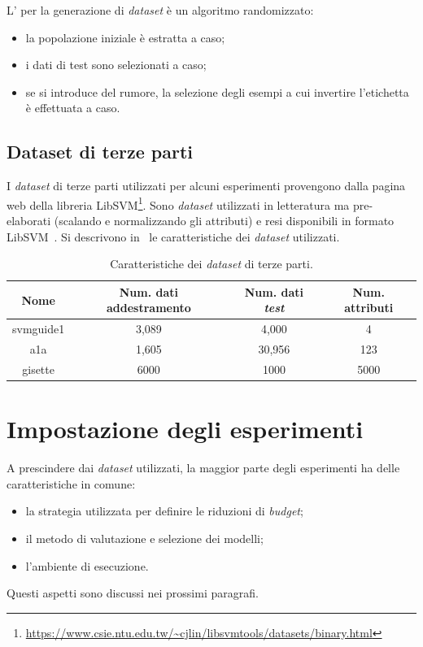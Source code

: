 L' per la generazione di \emph{dataset} è un algoritmo randomizzato:
\begin{itemize}
    \item la popolazione iniziale è estratta a caso;
    \item i dati di test sono selezionati a caso;
    \item se si introduce del rumore, la selezione degli esempi a cui invertire l'etichetta è effettuata a caso.
\end{itemize}

\subsection{Dataset di terze parti}
I \emph{dataset} di terze parti utilizzati per alcuni esperimenti provengono dalla pagina web della libreria LibSVM\footnote{\url{https://www.csie.ntu.edu.tw/~cjlin/libsvmtools/datasets/binary.html}}.
Sono \emph{dataset} utilizzati in letteratura ma pre-elaborati (scalando e normalizzando gli attributi) e resi disponibili in formato LibSVM~\cite{libsvm}.
Si descrivono in~ le caratteristiche dei \emph{dataset} utilizzati.
\begin{table}
    \centering
    \begin{tabular}{cccc}
        \toprule
        Nome & Num. dati addestramento & Num. dati \emph{test} & Num. attributi\\
        \midrule
        svmguide1 &  3,089 & 4,000 & 4 \\
        a1a & 1,605	& 30,956 & 123\\
        gisette & 6000 & 1000 & 5000 \\
        \bottomrule
    \end{tabular}
    \caption{Caratteristiche dei \emph{dataset} di terze parti.}
    \label{tab:uci_datasets}
\end{table}


\section{Impostazione degli esperimenti}\label{sec:impostazione_esperimenti}
A prescindere dai \emph{dataset} utilizzati, la maggior parte degli esperimenti ha delle caratteristiche in comune:
\begin{itemize}
    \item la strategia utilizzata per definire le riduzioni di \emph{budget};
    \item il metodo di valutazione e selezione dei modelli;
    \item l'ambiente di esecuzione.
\end{itemize}
Questi aspetti sono discussi nei prossimi paragrafi.

